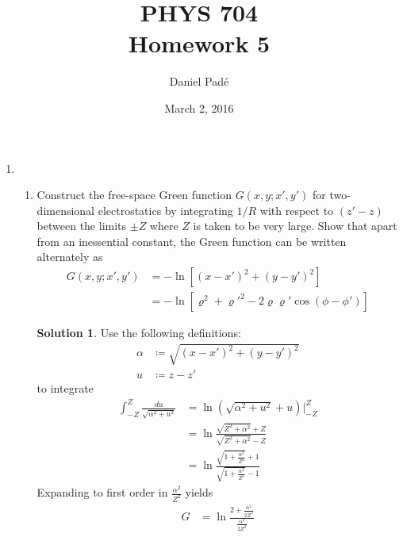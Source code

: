 \documentclass[letter,12pt]{article}
\title{PHYS 704 \\ Homework 5}
\author{Daniel Pad\'e}
\date{March 2, 2016}
\theoremstyle{definition}
\newtheorem*{sol}{Solution}
\begin{document}
\maketitle
\begin{enumerate}
    \item
        \begin{enumerate}
            \item
                Construct the free-space Green function $G(x, y; x',
                y')$ for two-dimensional electrostatics by integrating
                $1/R$ with respect to $(z' - z)$ between the limits
                $\pm Z$ where $Z$ is taken to be very large. Show that
                apart from an inessential constant, the Green function
                can be written alternately as
                \begin{align*}
                    G(x, y; x', y') &= - \ln \left[ {(x - x')}^2 + {(y - y')}^2 \right]
                    \\
                    &= - \ln \left[ \varrho^2 + \varrho'^2 - 2 \varrho \varrho' \cos( \phi - \phi' )\right]
                \end{align*}
                \begin{sol}
                    Use the following definitions:
                    \begin{align*}
                        \alpha &\coloneqq \sqrt{{(x - x')}^2 + {(y - y')}^2}
                        \\
                        u &\coloneqq z - z'
                    \end{align*}
                    to integrate
                    \begin{align*}
                        \int_{-Z}^{Z} \frac{du}{\sqrt{\alpha^2 + u^2}}
                        &= \ln \left( \sqrt{\alpha^2 + u^2} + u \right) \biggr \rvert_{-Z}^{Z}
                        \\
                        &= \ln \frac{\sqrt{Z^2 + \alpha^2} + Z}{\sqrt{Z^2 + \alpha^2} - Z}
                        \\
                        &= \ln \frac{\sqrt{1 + \frac{\alpha^2}{Z^2}} + 1}{\sqrt{1 + \frac{\alpha^2}{Z^2}} - 1}
                    \end{align*}
                    Expanding to first order in $\frac{\alpha^2}{Z^2}$ yields
                    \begin{align*}
                        G &= \ln \frac{2 + \frac{\alpha^2}{2 Z^2}}{\frac{\alpha^2}{2Z^2}}
                        \\

\end{align*}
\end{sol}
\end{enumerate}
\end{enumerate}
\end{document}
